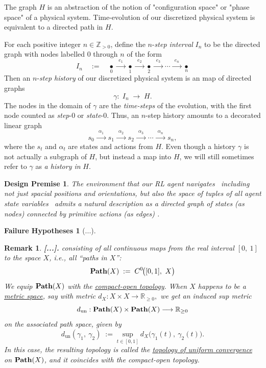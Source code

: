 \documentclass[11pt]{article}
\newtheorem{remark}{Remark}[subsection]
\newtheorem{premise}{Design Premise}
\newtheorem{failure}{Failure Hypotheses}
\begin{document}
The graph $H$ is an abstraction of the notion of "configuration space" or "phase space" of a physical system. Time-evolution of our discretized physical system is equivalent to a directed path in $H$.

For each positive integer $n\in\mathbb{Z}_{>0}$, define the $n$-{\em step interval} $I_{n}$ to be the directed graph with nodes labelled $0$ through $n$ of the form
$$
I_{n}\quad:=\quad
\underset{0}{\bullet}\xrightarrow{\ \ e_{1}\ \ }
\underset{1}{\bullet}\xrightarrow{\ \ e_2\ \ }
\underset{2}{\bullet}\xrightarrow{\ \ e_3\ \ }\cdots\xrightarrow{\ \ e_{n}\ \ }
\underset{n}{\bullet}
$$
Then an $n$-{\em step history} of our discretized physical system is an map of directed graphs
$$
\gamma:\; I_{n}\;\longrightarrow\;H.
$$
The nodes in the domain of $\gamma$ are the {\em time-steps} of the evolution, with the first node counted as {\em step}-$0$ or {\em state}-$0$. Thus, an $n$-step history amounts to a decorated linear graph
$$
s_{0}\xrightarrow{\ \ \alpha_1\ \ }s_{1}\xrightarrow{\ \ \alpha_2\ \ }s_{2}\xrightarrow{\ \ \alpha_3\ \ }\cdots\xrightarrow{\ \ \alpha_n\ \ }s_{n},
$$
where the $s_{t}$ and $\alpha_{t}$ are states and actions from $H$. Even though a history $\gamma$ is not actually a subgraph of $H$, but instead a map into $H$, we will still sometimes refer to $\gamma$ as {\em a history in} $H$.

\begin{premise}
The environment that our RL agent navigates \textemdash\ including not just spacial positions and orientations, but also the space of tuples of all agent state variables \textemdash\ admits a natural description as a directed graph of states (as nodes) connected by primitive actions (as edges) \cite[\S2]{Diet} \cite[\S1]{SPS}.
\end{premise}

\begin{failure}
[...]
\end{failure}


\begin{remark}
{\bf [...].}
\normalfont
 consisting of all continuous maps from the real interval $[0,\ 1]$ to the space $X$, i.e., all ``paths in $X$'':
$$
\bold{Path}(X)\;:=\;C^{0\!}\big([0,1],\ X\big)
$$
We equip $\bold{Path}(X)$ with the \href{https://en.wikipedia.org/wiki/Compact-open_topology}{{\em compact-open topology}}. When $X$ happens to be a \href{https://en.wikipedia.org/wiki/Metric_space}{{\em metric space}}, say with metric
$
d_{X}:X\!\times\!X\longrightarrow\mathbb{R}_{\ge0},
$
we get an induced {\em sup metric}
$$
d_{\text{un}}:\bold{Path}(X)\times\bold{Path}(X)\longrightarrow\mathbb{R}_{\ge0}
$$
on the associated path space, given by
$$
d_\text{un}(\gamma_{1},\ \!\gamma_{2})
\;:=\;
\underset{t\in[0,1]}{\text{sup}}
\ d_{X\!}\big(\gamma_{1\!}(t),\ \!\gamma_{2}(t)\big).
$$
In this case, the resulting topology is called the \href{https://en.wikipedia.org/wiki/Uniform_convergence}{\em topology of uniform convergence} on $\bold{Path}(X)$, and it coincides with the compact-open topology.

\end{remark}
\end{document}

